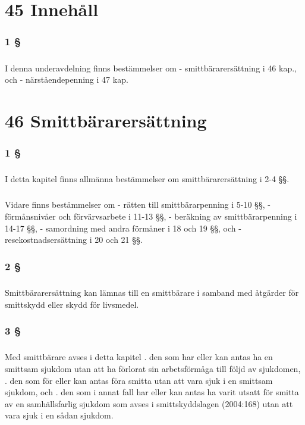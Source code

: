 \documentclass[a4paper,notitlepage,openany,10pt]{book}
\begin{document}
\chapter*{45 Innehåll}
\subsection*{1 §}
\paragraph*{}
I denna underavdelning finns bestämmelser om
\newline - smittbärarersättning i 46 kap., och - närståendepenning i 47 kap.
\chapter*{46 Smittbärarersättning}
\subsection*{1 §}
\paragraph*{}
I detta kapitel finns allmänna bestämmelser om smittbärarersättning i 2-4 §§.
\paragraph*{}
Vidare finns bestämmelser om - rätten till smittbärarpenning i 5-10 §§,
\newline - förmånsnivåer och förvärvsarbete i 11-13 §§, - beräkning av smittbärarpenning i 14-17 §§,
\newline - samordning med andra förmåner i 18 och 19 §§, och
\newline - resekostnadsersättning i 20 och 21 §§.
\subsection*{2 §}
\paragraph*{}
Smittbärarersättning kan lämnas till en smittbärare i samband med åtgärder för smittskydd eller skydd för livsmedel.
\subsection*{3 §}
\paragraph*{}
Med smittbärare avses i detta kapitel
. den som har eller kan antas ha en smittsam sjukdom utan att ha förlorat sin arbetsförmåga till följd av sjukdomen,
. den som för eller kan antas föra smitta utan att vara sjuk i en smittsam sjukdom, och
. den som i annat fall har eller kan antas ha varit utsatt för smitta av en samhällsfarlig sjukdom som avses i smittskyddslagen (2004:168) utan att vara sjuk i en sådan sjukdom.
\end{document}
